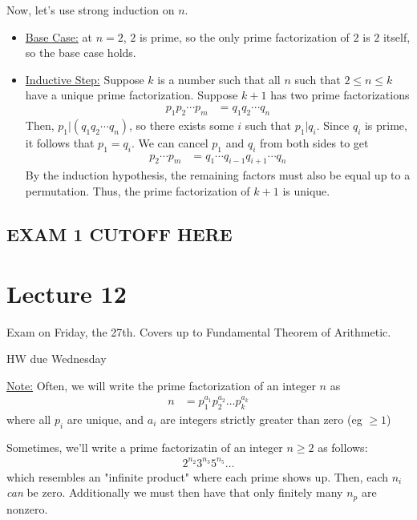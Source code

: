 \documentclass{article}
\begin{document}
Now, let's use strong induction on $n$. \begin{itemize}
    \item \underline{Base Case:} at $n=2$, $2$ is prime, so the only prime factorization of $2$ is $2$ itself, so the base case holds.
    \item \underline{Inductive Step:} Suppose $k$ is a number such that all $n$ such that $2\leq n\leq k$ have a unique prime factorization. Suppose $k+1$ has two prime factorizations \begin{align*}
        p_1p_2\cdots p_m &= q_1q_2\cdots q_n
    \end{align*}
    Then, $p_1|(q_1q_2\cdots q_n)$, so there exists some $i$ such that $p_1|q_i$. Since $q_i$ is prime, it follows that $p_1=q_i$. We can cancel $p_1$ and $q_i$ from both sides to get \begin{align*}
        p_2\cdots p_m &= q_1\cdots q_{i-1} q_{i+1}\cdots q_n
    \end{align*}
    By the induction hypothesis, the remaining factors must also be equal up to a permutation. Thus, the prime factorization of $k+1$ is unique.
\end{itemize}

\subsection{EXAM 1 CUTOFF HERE}

\section{Lecture 12}

Exam on Friday, the 27th. Covers up to Fundamental Theorem of Arithmetic.

HW due Wednesday

\underline{Note:} Often, we will write the prime factorization of an integer $n$ as \begin{align*}
    n&=p_1^{a_1}p_2^{a_2}\dots p_k^{a_k}
\end{align*}where all $p_i$ are unique, and $a_i$ are integers strictly greater than zero (eg $\geq 1$)

Sometimes, we'll write a prime factorizatin of an integer $n\geq 2$ as follows:\begin{align*}
    2^{n_2}3^{n_3}5^{n_5}\dots
\end{align*}which resembles an "infinite product" where each prime shows up. Then, each $n_i$ \textit{can} be zero. Additionally we must then have that only finitely many $n_p$ are nonzero. 
\end{document}
